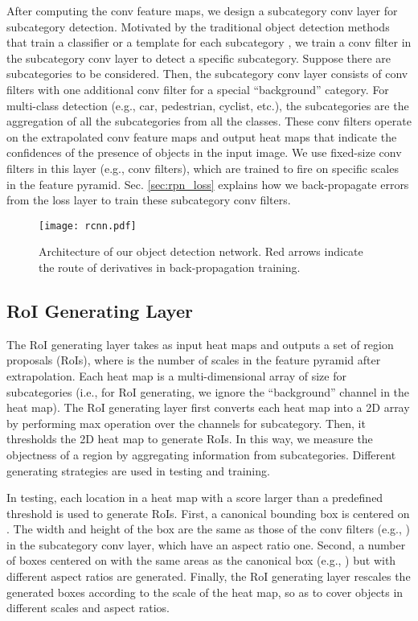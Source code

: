 \documentclass[10pt,twocolumn,letterpaper]{article}
\begin{document}
After computing the conv feature maps, we design a subcategory conv layer for subcategory detection. Motivated by the traditional object detection methods that train a classifier or a template for each subcategory \cite{felzenszwalb2010object,malisiewicz2011ensemble,xiang2015data}, we train a conv filter in the subcategory conv layer to detect a specific subcategory. Suppose there are  subcategories to be considered. Then, the subcategory conv layer consists of  conv filters with one additional conv filter for a special ``background'' category. For multi-class detection (e.g., car, pedestrian, cyclist, etc.), the  subcategories are the aggregation of all the subcategories from all the classes. These conv filters operate on the extrapolated conv feature maps and output heat maps that indicate the confidences of the presence of objects in the input image. We use fixed-size conv filters in this layer (e.g.,  conv filters), which are trained to fire on specific scales in the feature pyramid. Sec. \ref{sec:rpn_loss} explains how we back-propagate errors from the loss layer to train these subcategory conv filters.

\begin{figure*} \small 
	\centering
	\texttt{[image: rcnn.pdf]}
	\caption{Architecture of our object detection network. Red arrows indicate the route of derivatives in back-propagation training.}
	\label{fig:rcnn}
	\vspace{-4mm}
\end{figure*}

\subsection{RoI Generating Layer}

The RoI generating layer takes as input  heat maps and outputs a set of region proposals (RoIs), where  is the number of scales in the feature pyramid after extrapolation. Each heat map is a multi-dimensional array of size  for  subcategories (i.e., for RoI generating, we ignore the ``background'' channel in the heat map). The RoI generating layer first converts each heat map into a  2D array by performing max operation over the channels for subcategory. Then, it thresholds the 2D heat map to generate RoIs. In this way, we measure the objectness of a region by aggregating information from subcategories. Different generating strategies are used in testing and training.

In testing, each location  in a heat map with a score larger than a predefined threshold is used to generate RoIs. First, a canonical bounding box is centered on . The width and height of the box are the same as those of the conv filters (e.g., ) in the subcategory conv layer, which have an aspect ratio one. Second, a number of boxes centered on  with the same areas as the canonical box (e.g., ) but with different aspect ratios are generated. Finally, the RoI generating layer rescales the generated boxes according to the scale of the heat map, so as to cover objects in different scales and aspect ratios.
\end{document}
